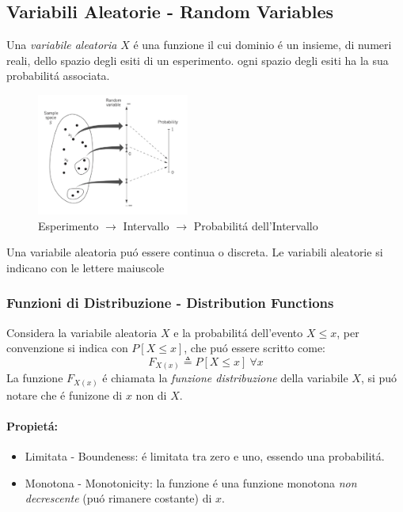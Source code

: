     \subsection{Variabili Aleatorie - Random Variables}
        Una \emph{variabile aleatoria} $X$ é una funzione il cui dominio é un insieme, di numeri reali, dello spazio degli esiti di un esperimento. ogni spazio degli esiti
        ha la sua probabilitá associata. 
        \begin{figure}[H]
            \centering
            \includegraphics[width = 5cm]{media/insieme variabili aleatorie.png}
            \caption{Esperimento $\rightarrow$ Intervallo $\rightarrow$ Probabilitá dell'Intervallo}
        \end{figure}
        Una variabile aleatoria puó essere continua o discreta. Le variabili aleatorie si indicano con le lettere
        maiuscole
        \subsubsection{Funzioni di Distribuzione - Distribution Functions}
            Considera la variabile aleatoria $X$ e la probabilitá dell'evento $X\leq x$, per convenzione si indica con $P[X\leq x]$,
            che puó essere scritto come:
            \[
                F_{X(x)} \triangleq P[X\leq x]\ \forall x    
            \]
            La funzione $F_{X(x)}$ é chiamata la \emph{funzione distribuzione} della variabile $X$, si puó notare che é funizone di $x$ non di 
            $X$.
            \paragraph{Propietá:}
                \begin{itemize}
                    \item {Limitata - Boundeness: é limitata tra zero e uno, essendo una probabilitá.}
                    \item {Monotona - Monotonicity: la funzione é una funzione monotona \emph{non decrescente} (puó rimanere costante) di $x$.}
                \end{itemize}
